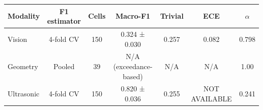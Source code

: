 \begin{tabular}{lcccccc}
\toprule
Modality & F1 estimator & Cells & Macro-F1 & Trivial & ECE & $\alpha$ \\
\midrule
Vision & 4-fold CV & 150 & 0.324 ± 0.030 & 0.257 & 0.082 & 0.798 \\
Geometry & Pooled & 39 & N/A (exceedance-based) & N/A & N/A & 1.00 \\
Ultrasonic & 4-fold CV & 150 & 0.820 ± 0.036 & 0.255 & NOT AVAILABLE & 0.241 \\
\bottomrule
\end{tabular}
